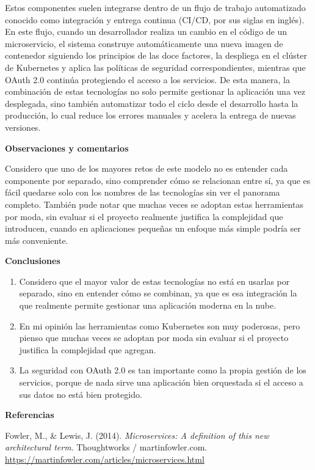 \documentclass[12pt,letterpaper]{article}
\newcommand{\subtitulo}[1]{\vspace{12pt}\noindent\textbf{#1}\par\vspace{10pt}}
\begin{document}
Estos componentes suelen integrarse dentro de un flujo de trabajo automatizado conocido como integración y entrega continua (CI/CD, por sus siglas en inglés). En este flujo, cuando un desarrollador realiza un cambio en el código de un microservicio, el sistema construye automáticamente una nueva imagen de contenedor siguiendo los principios de las doce factores, la despliega en el clúster de Kubernetes y aplica las políticas de seguridad correspondientes, mientras que OAuth 2.0 continúa protegiendo el acceso a los servicios. De esta manera, la combinación de estas tecnologías no solo permite gestionar la aplicación una vez desplegada, sino también automatizar todo el ciclo desde el desarrollo hasta la producción, lo cual reduce los errores manuales y acelera la entrega de nuevas versiones.

\subtitulo{Observaciones y comentarios}
Considero que uno de los mayores retos de este modelo no es entender cada componente por separado, sino comprender cómo se relacionan entre sí, ya que es fácil quedarse solo con los nombres de las tecnologías sin ver el panorama completo. También pude notar que muchas veces se adoptan estas herramientas por moda, sin evaluar si el proyecto realmente justifica la complejidad que introducen, cuando en aplicaciones pequeñas un enfoque más simple podría ser más conveniente.

\subtitulo{Conclusiones}
\begin{enumerate}[label=\arabic*., left=0pt, itemsep=2pt]
\item Considero que el mayor valor de estas tecnologías no está en usarlas por separado, sino en entender cómo se combinan, ya que es esa integración la que realmente permite gestionar una aplicación moderna en la nube.
\item En mi opinión las herramientas como Kubernetes son muy poderosas, pero pienso que muchas veces se adoptan por moda sin evaluar si el proyecto justifica la complejidad que agregan.
\item La seguridad con OAuth 2.0 es tan importante como la propia gestión de los servicios, porque de nada sirve una aplicación bien orquestada si el acceso a sus datos no está bien protegido.
\end{enumerate}

\subtitulo{Referencias}

\hangindent=1cm \noindent Fowler, M., \& Lewis, J. (2014). \textit{Microservices: A definition of this new architectural term}. Thoughtworks / martinfowler.com. \url{https://martinfowler.com/articles/microservices.html}
\end{document}
